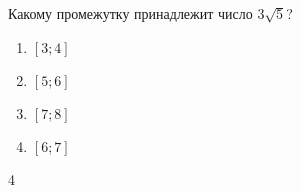 \begin{ex}
	Какому промежутку принадлежит число $3\sqrt{5}$?
	
	\selectanswer
	\begin{multicols}{4}
		\begin{enumerate}[label=\arabic*)]
			\item $[3;4]$
			\item $[5;6]$
			\item $[7;8]$
			\item $[6;7]$
		\end{enumerate}
	\end{multicols}
	\begin{answer}
		4
	\end{answer}
\end{ex}